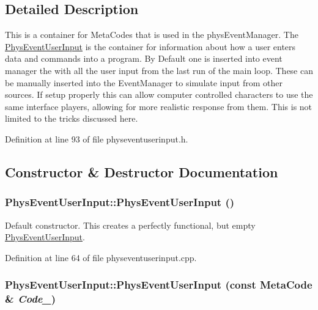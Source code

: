 \subsection{Detailed Description}
This is a container for MetaCodes that is used in the physEventManager. The \hyperlink{classPhysEventUserInput}{PhysEventUserInput} is the container for information about how a user enters data and commands into a program. By Default one is inserted into event manager the with all the user input from the last run of the main loop. These can be manually inserted into the EventManager to simulate input from other sources. If setup properly this can allow computer controlled characters to use the same interface players, allowing for more realistic response from them. This is not limited to the tricks discussed here. 

Definition at line 93 of file physeventuserinput.h.

\subsection{Constructor \& Destructor Documentation}
\hypertarget{classPhysEventUserInput_a6f8eaf698e8109d5cb30f2f17044f1ba}{
\subsubsection[{PhysEventUserInput}]{\setlength{\rightskip}{0pt plus 5cm}PhysEventUserInput::PhysEventUserInput ()}}
\label{dc/d0e/classPhysEventUserInput_a6f8eaf698e8109d5cb30f2f17044f1ba}


Default constructor. This creates a perfectly functional, but empty \hyperlink{classPhysEventUserInput}{PhysEventUserInput}. 

Definition at line 64 of file physeventuserinput.cpp.\hypertarget{classPhysEventUserInput_ae13b1b02bfa3ef64dc4205478a68810f}{
\subsubsection[{PhysEventUserInput}]{\setlength{\rightskip}{0pt plus 5cm}PhysEventUserInput::PhysEventUserInput (const {\bf MetaCode} \& {\em Code\_\-})}}
\label{dc/d0e/classPhysEventUserInput_ae13b1b02bfa3ef64dc4205478a68810f}



